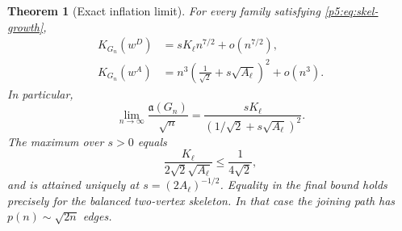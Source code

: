 \documentclass[11pt,a4paper]{article}
\newtheorem{theorem}{Theorem}[section]
\theoremstyle{definition}
\theoremstyle{remark}
\numberwithin{equation}{section}
\begin{document}
\begin{theorem}[Exact inflation limit]\label{p5:thm:skel-inflation}
For every family satisfying \eqref{p5:eq:skel-growth},
\begin{align}
 K_{G_n}(w^D)&=sK_\ell n^{7/2}+o(n^{7/2}),
                         \label{p5:eq:skel-D-asymp}\\
 K_{G_n}(w^A)&=n^3\left(\frac1{\sqrt2}
                   +s\sqrt{A_\ell}\right)^2+o(n^3).
                         \label{p5:eq:skel-A-asymp}
\end{align}
In particular,
\begin{equation}\label{p5:eq:skel-ratio-limit}
 \lim_{n\to\infty}\frac{\mathfrak a(G_n)}{\sqrt n}
 =\frac{sK_\ell}{(1/\sqrt2+s\sqrt{A_\ell})^2}.
\end{equation}
The maximum over $s>0$ equals
\begin{equation}\label{p5:eq:skel-scale-optimum}
 \frac{K_\ell}{2\sqrt2\sqrt{A_\ell}}
 \leq\frac1{4\sqrt2},
\end{equation}
and is attained uniquely at $s=(2A_\ell)^{-1/2}$.
Equality in the final bound holds precisely for the balanced
two-vertex skeleton.  In that case the joining path has
$p(n)\sim\sqrt{2n}$ edges.
\end{theorem}
\end{document}
